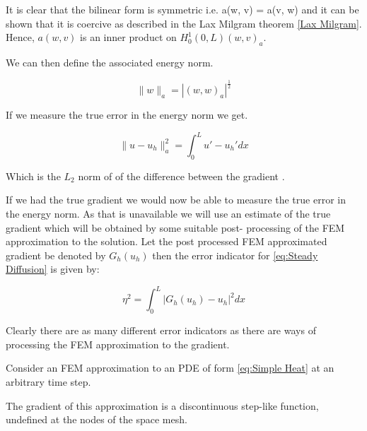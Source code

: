 \documentclass{uonmathreport}
\theoremstyle{definition}
\theoremstyle{problem}
\theoremstyle{theorem}
\begin{document}
{It is clear that the bilinear form is symmetric i.e.  a(w, v) = a(v, w) and it can be shown that it is coercive as described in the Lax Milgram theorem \ref{Lax Milgram}. Hence, $a(w, v)$ is an inner product on $H^1_0(0, L) (w, v)_a$.

We can then define the associated energy norm.

\begin{equation}
\|w\|_a = |(w, w)_a|^\frac{1}{2}
\end{equation}

If we measure the true error in the energy norm we get.

\begin{equation}
\|u-u_h\|_a^2 = \int_0^L  u' - u_h'  dx
\end{equation}

Which is the $L_2$ norm of of the difference between the gradient .

If we had the true gradient we would now be able to measure the true error in the energy norm. As that is unavailable we will use an estimate of the true gradient which will be obtained by some suitable post- processing of the FEM approximation to the solution. Let the post processed FEM approximated gradient be denoted by $G_h(u_h)$ then the error indicator for \ref{eq:Steady Diffusion} is given by:

\begin{equation}
\eta^2 = \int_0^L  |G_h(u_h) - u_h|^2  dx
\end{equation}

Clearly there are as many different error indicators as there are ways of processing the FEM approximation to the gradient.

Consider an FEM approximation to an PDE of form \ref{eq:Simple Heat} at an arbitrary time step.

\begin{center}
\end{center}

The gradient of this approximation is a discontinuous step-like function, undefined at the nodes of the space mesh.

\begin{center}
\begin{tikzpicture}


\end{tikzpicture}
\end{center}}
\end{document}
